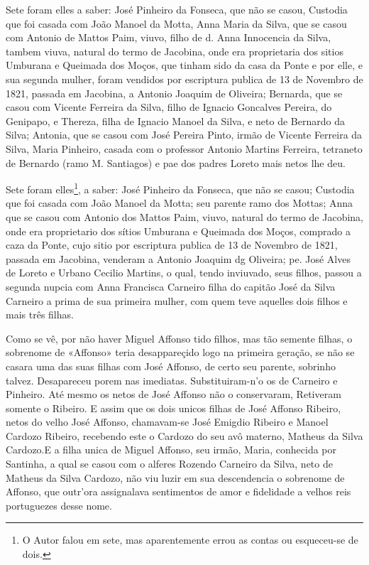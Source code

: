 Sete foram elles a saber: José Pinheiro da Fonseca, que não se casou, Custodia que foi casada com João Manoel da Motta, Anna Maria da Silva, que se casou com Antonio de Mattos Paim, viuvo, filho de d. Anna Innocencia da Silva, tambem viuva, natural do termo de Jacobina, onde era proprietaria dos sitios Umburana e Queimada dos Moços, que tinham sido da casa da Ponte e por elle, e sua segunda mulher, foram vendidos por escriptura publica de 13 de Novembro de 1821, passada em Jacobina, a Antonio Joaquim de Oliveira; Bernarda, que se casou com Vicente Ferreira da Silva, filho de Ignacio Goncalves Pereira, do Genipapo, e Thereza, filha de Ignacio Manoel da Silva, e neto de Bernardo da Silva; Antonia\label{ampaim}, que se casou com José Pereira Pinto, irmão de Vicente Ferreira da Silva, Maria Pinheiro, casada com o professor Antonio Martins Ferreira, tetraneto de Bernardo (ramo M. Santiagos) e pae dos padres Loreto mais netos lhe deu. 

Sete foram elles\footnote{O Autor falou em sete, mas aparentemente errou as contas ou esqueceu-se de dois.}, a saber: José Pinheiro da Fonseca, que não se casou; Custodia que foi casada com João Manoel da Motta; seu parente ramo dos Mottas; Anna que se casou com Antonio dos Mattos Paim, viuvo, natural do termo de Jacobina, onde era proprietario dos sítios Umburana e Queimada dos Moços, comprado a caza da Ponte, cujo sitio por escriptura publica de 13 de Novembro de 1821, passada em Jacobina, venderam a Antonio Joaquim dg Oliveira; pe. José Alves de Loreto e Urbano Cecilio Martins, o qual, tendo inviuvado, seus filhos, passou a segunda nupcia com Anna Francisca Carneiro filha do capitão José da Silva Carneiro a prima de sua primeira mulher, com quem teve aquelles dois filhos e mais três filhas.

Como se vê, por não haver Miguel Affonso tido filhos, mas tão semente filhas, o sobrenome de «Affonso» teria desappareçido logo na primeira geração, se não se casara uma das suas filhas com José Affonso, de certo seu parente, sobrinho talvez. Desapareceu porem nas imediatas. Substituiram-n'o os de Carneiro e Pinheiro. Até mesmo os netos de José Affonso não o conservaram, Retiveram somente o Ribeiro. E assim que os dois unicos filhas de José Affonso Ribeiro, netos do velho José Affonso, chamavam-se José Emigdio Ribeiro e Manoel Cardozo Ribeiro, recebendo este o Cardozo do seu avô materno, Matheus da Silva Cardozo.E a filha unica de Miguel Affonso, seu irmão, Maria, conhecida por Santinha, a qual se casou com o alferes Rozendo Carneiro da Silva, neto de Matheus da Silva Cardozo, não viu luzir em sua descendencia o sobrenome de Affonso, que outr'ora assignalava sentimentos de amor e fidelidade a velhos reis portuguezes desse nome.

